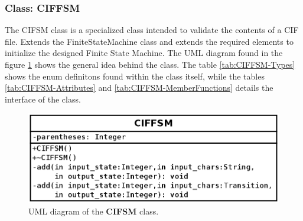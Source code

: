 \documentclass[11pt,twoside,openany,x11names,svgnames]{memoir}
\begin{document}
\subsubsection{Class: CIFFSM}\label{Class-CIFFSM}

The CIFSM class is a specialized class intended to validate the contents of a CIF file. Extends the FiniteStateMachine class and extends the required elements to initialize the designed Finite State Machine. The UML diagram found in the figure \ref{fig:class-ciffsm} shows the general idea behind the class. The table \ref{tab:CIFFSM-Types} shows the enum definitons found within the class itself, while the tables \ref{tab:CIFFSM-Attributes} and \ref{tab:CIFFSM-MemberFunctions} details the interface of the class.

\begin{figure}
	\centering
	\includegraphics[scale=0.4, clip=true, trim= 0pt 0pt 0pt 0pt]{images/chapter03-image11}
	\caption{UML diagram of the \textbf{CIFSM} class.}
	\label{fig:class-ciffsm}
\end{figure}
\end{document}
